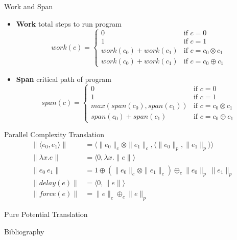 \documentclass[pdf]{beamer}
\newcommand{\LP}{\langle}
\newcommand{\RP}{\rangle}
\begin{document}
\begin{frame}{Work and Span}
  \begin{itemize}
    \item \textbf{Work} total steps to run program
      \begin{equation*}
        work(c) = \begin{cases}
          0 &\text{if } c = 0 \\
          1 &\text{if } c = 1 \\
          work(c_0) + work(c_1) &\text{if } c = c_0 \otimes c_1 \\
          work(c_0) + work(c_1) &\text{if } c = c_0 \oplus c_1
        \end{cases}
      \end{equation*}
    \item \textbf{Span} critical path of program
      \begin{equation*}
        span(c) = \begin{cases}
          0 &\text{if } c = 0 \\
          1 &\text{if } c = 1 \\
          max(span(c_0), span(c_1)) &\text{if } c = c_0 \otimes c_1 \\
          span(c_0) + span(c_1) &\text{if } c = c_0 \oplus c_1
        \end{cases}
      \end{equation*}
  \end{itemize}
\end{frame}

\begin{frame}{Parallel Complexity Translation}
  \begin{align*}
    \|\LP e_0, e_1 \RP \| &= \LP \|e_0\|_c \otimes \|e_1\|_c, \LP \|e_0\|_p, \|e_1\|_p\RP\RP \\
    \|\lambda x.e\| &= \LP 0, \lambda x.\|e\| \RP \\
    \|e_0\ e_1\| &= 1 \oplus (\|e_0\|_c \otimes \|e_1\|_c) \oplus_c \|e_0\|_p\ \|e_1\|_p \\
    \|delay(e)\| &= \LP 0, \|e\|\RP \\
    \|force(e)\| &= \|e\|_c \oplus_c \|e\|_p
  \end{align*}
\end{frame}

\begin{frame}{Pure Potential Translation}
\end{frame}


\begin{frame}{Bibliography}
  
  
\end{frame}
\end{document}

